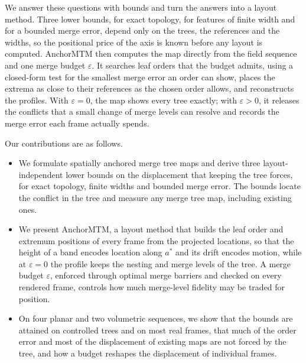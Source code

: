 We answer these questions with bounds and turn the answers into a layout method. Three lower bounds, for exact topology, for features of finite width and for a bounded merge error, depend only on the trees, the references and the widths, so the positional price of the axis is known before any layout is computed. AnchorMTM then computes the map directly from the field sequence and one merge budget $\varepsilon$. It searches leaf orders that the budget admits, using a closed-form test for the smallest merge error an order can show, places the extrema as close to their references as the chosen order allows, and reconstructs the profiles. With $\varepsilon=0$, the map shows every tree exactly; with $\varepsilon>0$, it releases the conflicts that a small change of merge levels can resolve and records the merge error each frame actually spends.

Our contributions are as follows.
\begin{itemize}\setlength{\itemsep}{1pt}\setlength{\parsep}{0pt}
\item We formulate spatially anchored merge tree maps and derive three layout-independent lower bounds on the displacement that keeping the tree forces, for exact topology, finite widths and bounded merge error. The bounds locate the conflict in the tree and measure any merge tree map, including existing ones.
\item We present AnchorMTM, a layout method that builds the leaf order and extremum positions of every frame from the projected locations, so that the height of a band encodes location along $a^*$ and its drift encodes motion, while at $\varepsilon=0$ the profile keeps the nesting and merge levels of the tree. A merge budget $\varepsilon$, enforced through optimal merge barriers and checked on every rendered frame, controls how much merge-level fidelity may be traded for position.
\item On four planar and two volumetric sequences, we show that the bounds are attained on controlled trees and on most real frames, that much of the order error and most of the displacement of existing maps are not forced by the tree, and how a budget reshapes the displacement of individual frames.
\end{itemize}
